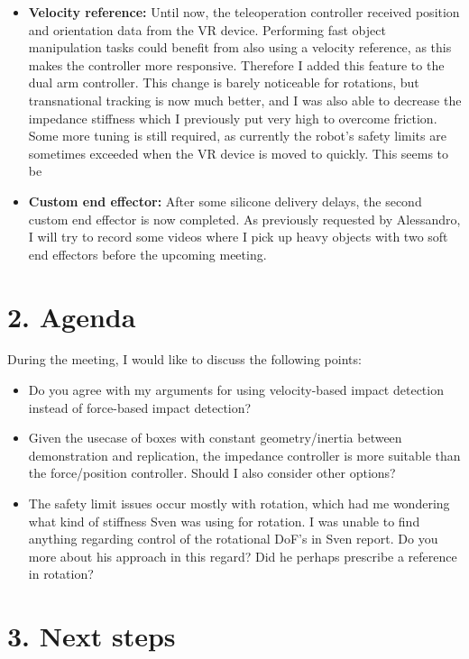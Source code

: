 \documentclass[11pt]{report}
\numberwithin{equation}{section}        %
\numberwithin{figure}{section}          %
\numberwithin{table}{section}           %
\begin{document}
\begin{itemize}
  \item \textbf{Velocity reference:} Until now, the teleoperation controller received position and orientation data from the VR device. Performing fast object manipulation tasks could benefit from also using a velocity reference, as this makes the controller more responsive. Therefore I added this feature to the dual arm controller. This change is barely noticeable for rotations, but transnational tracking is now much better, and I was also able to decrease the impedance stiffness which I previously put very high to overcome friction. Some more tuning is still required, as currently the robot's safety limits are sometimes exceeded when the VR device is moved to quickly. This seems to be 

  \item \textbf{Custom end effector:} After some silicone delivery delays, the second custom end effector is now completed. As previously requested by Alessandro, I will try to record some videos where I pick up heavy objects with two soft end effectors before the upcoming meeting.

  \end{itemize}
\newpage
  \section*{2. Agenda}
  During the meeting, I would like to discuss the following points:

  \begin{itemize}
      \item Do you agree with my arguments for using velocity-based impact detection instead of force-based impact detection? 
      \item Given the usecase of boxes with constant geometry/inertia between demonstration and replication, the impedance controller is more suitable than the force/position controller. Should I also consider other options?
      \item The safety limit issues occur mostly with rotation, which had me wondering what kind of stiffness Sven was using for rotation. I was unable to find anything regarding control of the rotational DoF's in Sven report. Do you more about his approach in this regard? Did he perhaps prescribe a reference in rotation?
  \end{itemize}

  \section*{3. Next steps}
\end{document}
